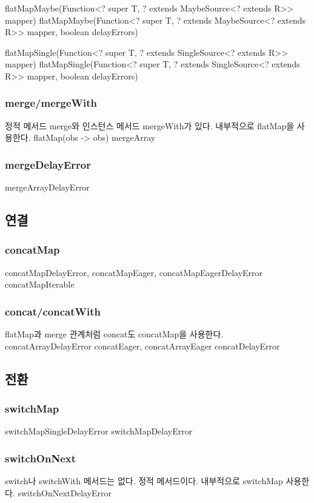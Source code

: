 \documentclass{book}
\begin{document}
{flatMapMaybe(Function<? super T, ? extends MaybeSource<? extends R>> mapper)
flatMapMaybe(Function<? super T, ? extends MaybeSource<? extends R>> mapper, boolean delayErrors)

flatMapSingle(Function<? super T, ? extends SingleSource<? extends R>> mapper)
flatMapSingle(Function<? super T, ? extends SingleSource<? extends R>> mapper, boolean delayErrors)
                                                                        
\subsubsection{merge/mergeWith}
정적 메서드 merge와 인스턴스 메서드 mergeWith가 있다.
내부적으로 flatMap을 사용한다.
flatMap(obs -> obs)
mergeArray



\subsubsection{mergeDelayError}
mergeArrayDelayError

\subsection{연결}
\subsubsection{concatMap}
concatMapDelayError, concatMapEager, concatMapEagerDelayError
concatMapIterable

\subsubsection{concat/concatWith}
flatMap과 merge 관계처럼 concat도 concatMap을 사용한다.
concatArrayDelayError
concatEager, concatArrayEager
concatDelayError

\subsection{전환}
\subsubsection{switchMap}
switchMapSingleDelayError
switchMapDelayError

\subsubsection{switchOnNext}
switch나 switchWith 메서드는 없다.
정적 메서드이다. 
내부적으로 switchMap 사용한다.
switchOnNextDelayError


}
\end{document}
